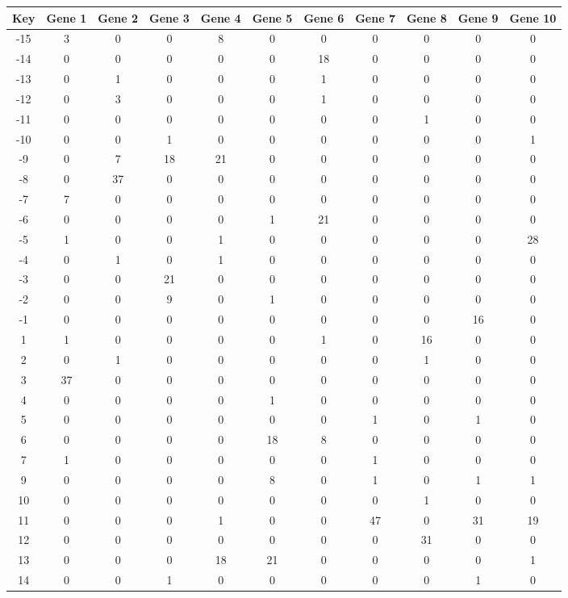 \begin{tabular}{|c|c|c|c|c|c|c|c|c|c|c|}
\hline
Key & Gene 1 & Gene 2 & Gene 3 & Gene 4 & Gene 5 & Gene 6 & Gene 7 & Gene 8 & Gene 9 & Gene 10 \\
\hline
-15 & 3 & 0 & 0 & 8 & 0 & 0 & 0 & 0 & 0 & 0 \\
-14 & 0 & 0 & 0 & 0 & 0 & 18 & 0 & 0 & 0 & 0 \\
-13 & 0 & 1 & 0 & 0 & 0 & 1 & 0 & 0 & 0 & 0 \\
-12 & 0 & 3 & 0 & 0 & 0 & 1 & 0 & 0 & 0 & 0 \\
-11 & 0 & 0 & 0 & 0 & 0 & 0 & 0 & 1 & 0 & 0 \\
-10 & 0 & 0 & 1 & 0 & 0 & 0 & 0 & 0 & 0 & 1 \\
-9 & 0 & 7 & 18 & 21 & 0 & 0 & 0 & 0 & 0 & 0 \\
-8 & 0 & 37 & 0 & 0 & 0 & 0 & 0 & 0 & 0 & 0 \\
-7 & 7 & 0 & 0 & 0 & 0 & 0 & 0 & 0 & 0 & 0 \\
-6 & 0 & 0 & 0 & 0 & 1 & 21 & 0 & 0 & 0 & 0 \\
-5 & 1 & 0 & 0 & 1 & 0 & 0 & 0 & 0 & 0 & 28 \\
-4 & 0 & 1 & 0 & 1 & 0 & 0 & 0 & 0 & 0 & 0 \\
-3 & 0 & 0 & 21 & 0 & 0 & 0 & 0 & 0 & 0 & 0 \\
-2 & 0 & 0 & 9 & 0 & 1 & 0 & 0 & 0 & 0 & 0 \\
-1 & 0 & 0 & 0 & 0 & 0 & 0 & 0 & 0 & 16 & 0 \\
1 & 1 & 0 & 0 & 0 & 0 & 1 & 0 & 16 & 0 & 0 \\
2 & 0 & 1 & 0 & 0 & 0 & 0 & 0 & 1 & 0 & 0 \\
3 & 37 & 0 & 0 & 0 & 0 & 0 & 0 & 0 & 0 & 0 \\
4 & 0 & 0 & 0 & 0 & 1 & 0 & 0 & 0 & 0 & 0 \\
5 & 0 & 0 & 0 & 0 & 0 & 0 & 1 & 0 & 1 & 0 \\
6 & 0 & 0 & 0 & 0 & 18 & 8 & 0 & 0 & 0 & 0 \\
7 & 1 & 0 & 0 & 0 & 0 & 0 & 1 & 0 & 0 & 0 \\
9 & 0 & 0 & 0 & 0 & 8 & 0 & 1 & 0 & 1 & 1 \\
10 & 0 & 0 & 0 & 0 & 0 & 0 & 0 & 1 & 0 & 0 \\
11 & 0 & 0 & 0 & 1 & 0 & 0 & 47 & 0 & 31 & 19 \\
12 & 0 & 0 & 0 & 0 & 0 & 0 & 0 & 31 & 0 & 0 \\
13 & 0 & 0 & 0 & 18 & 21 & 0 & 0 & 0 & 0 & 1 \\
14 & 0 & 0 & 1 & 0 & 0 & 0 & 0 & 0 & 1 & 0 \\
\hline
\end{tabular}
